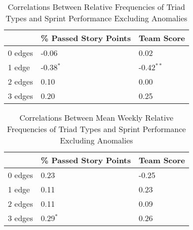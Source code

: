 \begin{table}
\caption{Correlations Between Relative Frequencies of Triad Types and Sprint Performance Excluding Anomalies}
    \begin{center}
        \label{tbl:triad_census_sans_anomalies}
        \begin{tabular}{|p{} | p{} | p{}|} 
            \hline
            & \textbf{\% Passed Story Points} & \textbf{Team Score} 
            \\ \hline
            0 edges & -0.06 & 0.02
            \\ \hline
            1 edge & -0.38$^{*}$ & -0.42$^{**}$
            \\ \hline
            2 edges & 0.10 & 0.00
            \\ \hline
            3 edges & 0.20 & 0.25
            \\ \hline
        \end{tabular}
    \end{center}
\end{table}

\begin{table}
    \caption{Correlations Between Mean Weekly Relative Frequencies of Triad Types and Sprint Performance Excluding Anomalies}
    \begin{center}
        \label{tbl:triad_census_avg_sans_anomalies}
        \begin{tabular}{|p{} | p{} | p{}|} 
            \hline
            & \textbf{\% Passed Story Points} & \textbf{Team Score} 
            \\ \hline
            0 edges & 0.23 & -0.25
            \\ \hline
            1 edge & 0.11 & 0.23
            \\ \hline
            2 edges & 0.11 & 0.09
            \\ \hline
            3 edges & 0.29$^{*}$ & 0.26
            \\ \hline
        \end{tabular}
    \end{center}
\end{table}

